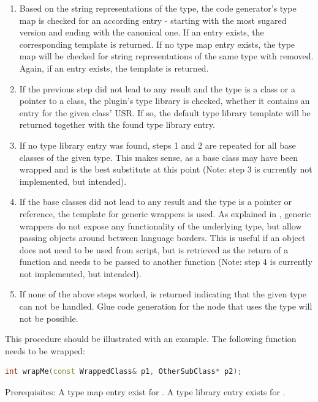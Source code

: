 \begin{enumerate}
\item Based on the string representations of the type, the code generator's type map is checked for an according entry - starting with the most sugared version and ending with the canonical one. If an entry exists, the corresponding template is returned. If no type map entry exists, the type map will be checked for string representations of the same type with  removed. Again, if an entry exists, the template is returned.
\item If the previous step did not lead to any result and the type is a class or a pointer to a class, the plugin's type library is checked, whether it contains an entry for the given class' USR. If so, the default type library template will be returned together with the found type library entry.
\item If no type library entry was found, steps 1 and 2 are repeated for all base classes of the given type. This makes sense, as a base class may have been wrapped and is the best substitute at this point (Note: step 3 is currently not implemented, but intended).
\item If the base classes did not lead to any result and the type is a pointer or reference, the template for generic wrappers is used. As explained in , generic wrappers do not expose any functionality of the underlying type, but allow passing objects around between language borders. This is useful if an object does not need to be used from script, but is retrieved as the return of a  function and needs to be passed to another  function (Note: step 4 is currently not implemented, but intended).
\item If none of the above steps worked,  is returned indicating that the given  type can not be handled. Glue code generation for the node that uses the type will not be possible.
\end{enumerate}

This procedure should be illustrated with an example. The following function needs to be wrapped:

\SingleSpacing
\begin{lstlisting}[language=C++, caption=Example function illustrating type resolution]
int wrapMe(const WrappedClass& p1, OtherSubClass* p2);
\end{lstlisting}
\OnehalfSpacing

Prerequisites: A type map entry exist for . A type library entry exists for .

